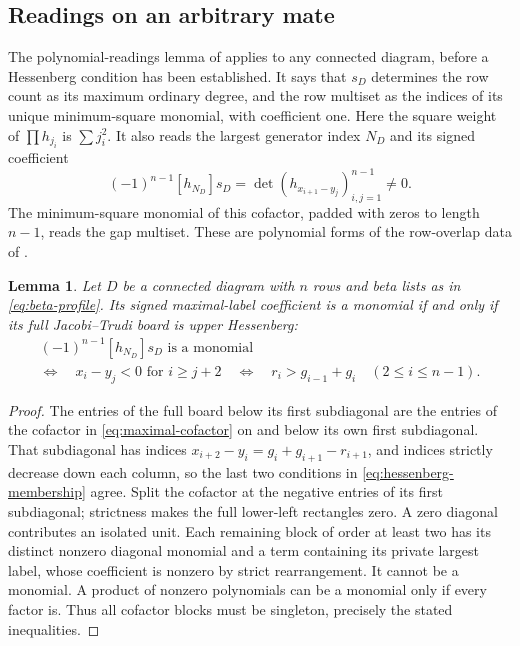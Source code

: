 \documentclass[11pt,a4paper]{amsart}
\numberwithin{equation}{section}
\theoremstyle{plain}
\newtheorem{lemma}[theorem]{Lemma}
\theoremstyle{definition}
\begin{document}
\subsection{Readings on an arbitrary mate}\label{subsec:readings}

The polynomial-readings lemma of \cite{Shields2026Cofactor} applies to
any connected diagram, before a Hessenberg condition has been established.
It says that \(s_D\) determines the row count as its maximum ordinary
degree, and the row multiset as the indices of its unique minimum-square
monomial, with coefficient one.  Here the square weight of
\(\prod h_{j_i}\) is \(\sum j_i^2\).  It also reads the largest
generator index \(N_D\) and its signed coefficient
\begin{equation}\label{eq:maximal-cofactor}
 (-1)^{n-1}[h_{N_D}]s_D
 =\det(h_{x_{i+1}-y_j})_{i,j=1}^{n-1}\ne0.
\end{equation}
The minimum-square monomial of this cofactor, padded with zeros to length
\(n-1\), reads the gap multiset.  These are polynomial forms of the
row-overlap data of \cite{Reiner2007Coincidences}.

\begin{lemma}\label{lem:hessenberg-membership}
Let \(D\) be a connected diagram with \(n\) rows and beta lists as in
\eqref{eq:beta-profile}.  Its signed maximal-label coefficient is a
monomial if and only if its full Jacobi--Trudi board is upper Hessenberg:
\begin{equation}\label{eq:hessenberg-membership}
 \begin{gathered}
 (-1)^{n-1}[h_{N_D}]s_D\text{ is a monomial}\\
 \Longleftrightarrow\quad
 x_i-y_j<0\text{ for }i\ge j+2
 \quad\Longleftrightarrow\quad
 r_i>g_{i-1}+g_i\quad(2\le i\le n-1).
 \end{gathered}
\end{equation}
\end{lemma}

\begin{proof}
The entries of the full board below its first subdiagonal are the entries
of the cofactor in \eqref{eq:maximal-cofactor} on and below its own first
subdiagonal.  That subdiagonal has indices
\(x_{i+2}-y_i=g_i+g_{i+1}-r_{i+1}\), and indices strictly decrease down
each column, so the last two conditions in \eqref{eq:hessenberg-membership}
agree.  Split the cofactor at the negative entries of its first
subdiagonal; strictness makes the full lower-left rectangles zero.  A zero
diagonal contributes an isolated unit.  Each remaining block of order at
least two has its distinct nonzero diagonal monomial and a term containing
its private largest label, whose coefficient is nonzero by strict
rearrangement.  It cannot be a monomial.  A product of nonzero polynomials
can be a monomial only if every factor is.  Thus all cofactor blocks must
be singleton, precisely the stated inequalities.
\end{proof}
\end{document}
